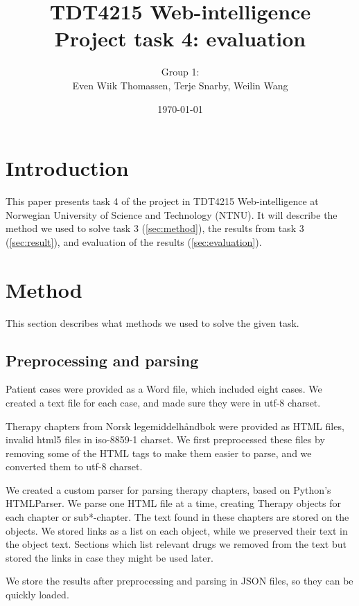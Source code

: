 \documentclass[a4paper, 12pt]{article}
\title{TDT4215 Web-intelligence\\Project task 4: evaluation}
\author{Group 1:\\Even Wiik Thomassen, Terje Snarby, Weilin Wang}
\date{\today}
\begin{document}

\maketitle
\tableofcontents


\section{Introduction}
This paper presents task 4 of the project in TDT4215 Web-intelligence at
Norwegian University of Science and Technology (NTNU). It will
describe the method we used to solve task 3 (\autoref{sec:method}),
the results from task 3 (\autoref{sec:result}),
and evaluation of the results (\autoref{sec:evaluation}).


\section{Method}
\label{sec:method}
This section describes what methods we used to solve the given task.

\subsection{Preprocessing and parsing}
Patient cases were provided as a Word file, which included eight cases. We
created a text file for each case, and made sure they were in utf-8 charset.

Therapy chapters from Norsk legemiddelhåndbok were provided as HTML files,
invalid html5 files in iso-8859-1 charset. We first preprocessed these files
by removing some of the HTML tags to make them easier to parse, and we
converted them to utf-8 charset.

We created a custom parser for parsing therapy chapters, based on Python's
HTMLParser. We parse one HTML file at a time, creating Therapy objects for
each chapter or sub*-chapter. The text found in these chapters are stored
on the objects. We stored links as a list on each object, while we preserved
their text in the object text. Sections which list relevant drugs we removed
from the text but stored the links in case they might be used later.

We store the results after preprocessing and parsing in JSON files, so they
can be quickly loaded.
\end{document}
